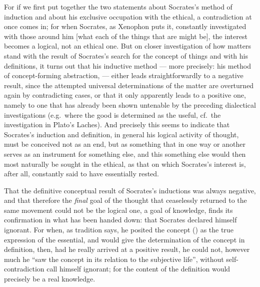For if we first put together the two statements about Socrates's
method of induction and about his exclusive occupation with
the ethical, a contradiction at once comes in; for
when Socrates, as Xenophon puts it, constantly investigated with
those around him  [what each of the things that are might be], the
interest becomes a logical, not an ethical one. But on closer investigation of how matters stand with the result of Socrates's search for the concept of things and with his
definitions, it turns out that his inductive method --- more precisely: his method of concept-forming abstraction, --- either
leads straightforwardly to a negative result, since the attempted universal
determinations of the matter are overturned again by contradicting cases, or that it only apparently leads to a positive one,
namely to one that has already been shown untenable by
the preceding dialectical investigations (e.g.\ where the
good is determined as the useful, cf.\ the investigation in Plato's Laches). And precisely this seems to indicate that Socrates's
induction and definition, in general his logical activity of thought, must be conceived not as an end, but as something
that in one way or another serves as an instrument for something
else, and this something else would then most naturally be sought in the
ethical, as that on which Socrates's interest is, after all, constantly
said to have essentially rested.

That the definitive conceptual result of Socrates's inductions was always negative, and that therefore the \emph{final} goal
of the thought that ceaselessly returned to the same
movement could not be the logical one, a goal of knowledge, finds
its confirmation in what has been handed down: that Socrates declared himself
ignorant. For when, as tradition says, he
posited the concept () as the true expression of the essential, and
would give the determination of the concept in definition, then,
had he really arrived at a positive result, he could not, however
much he ``saw the concept in its relation to the
subjective life'', without self-contradiction call himself ignorant;
for the content of the definition would precisely be a real
knowledge.


